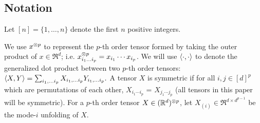 




\subsection{Notation}


Let $[n] = \{ 1, \dots, n \}$ denote the first $n$ positive integers.

We use $x^{\otimes p}$ to represent the $p$-th order tensor
formed by taking the outer product of $x \in \Re^d$; i.e. $x^{\otimes p}_{i_1 \ldots
i_p} = x_{i_1} \cdots x_{i_p}$. We will use
$\langle \cdot, \cdot \rangle$ to denote the generalized dot product between two $p$-th
order tensors: $\langle X, Y \rangle = \sum_{i_1, \ldots i_p} X_{i_1,
\ldots i_p} Y_{i_1, \ldots i_p}.$
A tensor $X$ is symmetric if for all $i,j \in [d]^p$ which are permutations of each other,
$X_{i_1 \cdots i_p}$ = $X_{j_1 \cdots j_p}$ (all tensors in this paper will be symmetric).
For a $p$-th order tensor $X \in (\mathbb{R}^d)^{\otimes p}$, let $X_{(i)} \in \Re^{d \times d^{p-1}}$
be the mode-$i$ unfolding of $X$.

